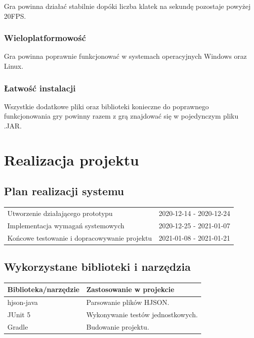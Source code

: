 \documentclass{article}
\begin{document}
				Gra powinna działać stabilnie dopóki liczba klatek na sekundę pozostaje powyżej 20FPS.
				
			\subsubsection{Wieloplatformowość}
			
				Gra powinna poprawnie funkcjonować w systemach operacyjnych Windows oraz Linux.
				
			\subsubsection{Łatwość instalacji}
			
				Wszystkie dodatkowe pliki oraz biblioteki konieczne do poprawnego funkcjonowania gry powinny razem z grą znajdować się w pojedynczym pliku .JAR.
			
				
			
	\section{Realizacja projektu}
	
		\subsection{Plan realizacji systemu}
			\begin{center}
				\begin{tabular}{lr}\hline
					Utworzenie działającego prototypu & 2020-12-14 - 2020-12-24 \\
					Implementacja wymagań systemowych & 2020-12-25 - 2021-01-07 \\
					Końcowe testowanie i dopracowywanie projektu & 2021-01-08 - 2021-01-21 \\ \hline
				\end{tabular}
			\end{center}
		\subsection{Wykorzystane biblioteki i narzędzia}
		
			\begin{center}
				\begin{tabular}{ll} \hline
					Biblioteka/narzędzie & Zastosowanie w projekcie \\ \hline
					hjson-java & Parsowanie plików HJSON. \\
					JUnit 5 & Wykonywanie testów jednostkowych. \\
					Gradle & Budowanie projektu. \\ \hline
				\end{tabular}
			\end{center}
		
\end{document}
